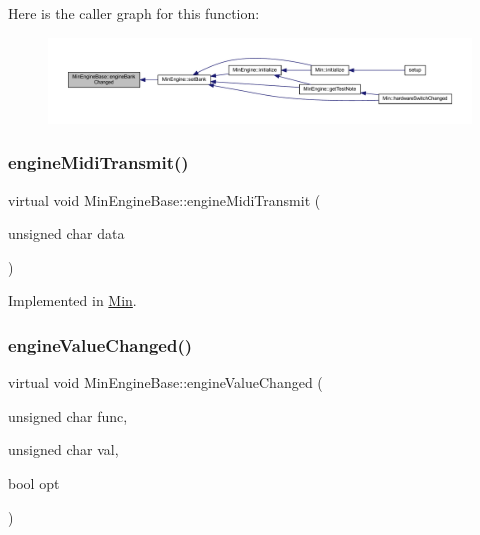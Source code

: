 Here is the caller graph for this function\+:
\nopagebreak
\begin{figure}[H]
\begin{center}
\leavevmode
\includegraphics[width=350pt]{d7/d0e/class_min_engine_base_a7c1b890b5c7f0004969304880aaaf563_icgraph}
\end{center}
\end{figure}
\mbox{\label{class_min_engine_base_aaed6930bcc32b2cccf9479fb73d043d9}} 
\subsubsection{\texorpdfstring{engine\+Midi\+Transmit()}{engineMidiTransmit()}}
{\footnotesize\ttfamily virtual void Min\+Engine\+Base\+::engine\+Midi\+Transmit (\begin{DoxyParamCaption}\item[{unsigned char}]{data }\end{DoxyParamCaption})\hspace{0.3cm}{\ttfamily [pure virtual]}}



Implemented in \hyperlink{class_min_a4b150119664bd46bd2a80561862ff666}{Min}.

\mbox{\label{class_min_engine_base_a35b19eb25b2bbfbcf0bc2262a63ec488}} 
\subsubsection{\texorpdfstring{engine\+Value\+Changed()}{engineValueChanged()}}
{\footnotesize\ttfamily virtual void Min\+Engine\+Base\+::engine\+Value\+Changed (\begin{DoxyParamCaption}\item[{unsigned char}]{func,  }\item[{unsigned char}]{val,  }\item[{bool}]{opt }\end{DoxyParamCaption})\hspace{0.3cm}{\ttfamily [pure virtual]}}




